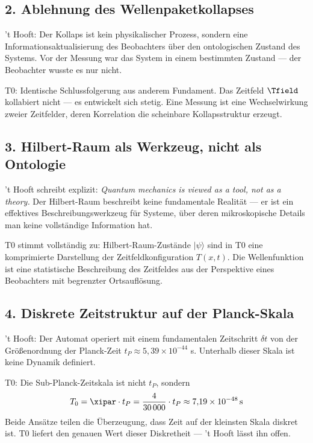 \subsection{2. Ablehnung des Wellenpaketkollapses}

't Hooft: Der Kollaps ist kein physikalischer Prozess, sondern eine
Informationsaktualisierung des Beobachters über den ontologischen Zustand des
Systems. Vor der Messung war das System in einem bestimmten Zustand — der
Beobachter wusste es nur nicht.

T0: Identische Schlussfolgerung aus anderem Fundament. Das Zeitfeld $\Tfield$
kollabiert nicht — es entwickelt sich stetig. Eine Messung ist eine
Wechselwirkung zweier Zeitfelder, deren Korrelation die scheinbare
Kollapsstruktur erzeugt.

\subsection{3. Hilbert-Raum als Werkzeug, nicht als Ontologie}

't Hooft schreibt explizit: \emph{Quantum mechanics is viewed as a tool, not as
a theory.} Der Hilbert-Raum beschreibt keine fundamentale Realität — er ist ein
effektives Beschreibungswerkzeug für Systeme, über deren mikroskopische Details
man keine vollständige Information hat.

T0 stimmt vollständig zu: Hilbert-Raum-Zustände $|\psi\rangle$ sind in T0 eine
komprimierte Darstellung der Zeitfeldkonfiguration $T(x,t)$. Die Wellenfunktion
ist eine statistische Beschreibung des Zeitfeldes aus der Perspektive eines
Beobachters mit begrenzter Ortsauflösung.

\subsection{4. Diskrete Zeitstruktur auf der Planck-Skala}

't Hooft: Der Automat operiert mit einem fundamentalen Zeitschritt $\delta t$
von der Größenordnung der Planck-Zeit $t_P \approx 5{,}39 \times 10^{-44}$ s.
Unterhalb dieser Skala ist keine Dynamik definiert.

T0: Die Sub-Planck-Zeitskala ist nicht $t_P$, sondern
\begin{equation}
    T_0 = \xipar \cdot t_P = \frac{4}{30\,000} \cdot t_P
    \approx 7{,}19 \times 10^{-48} \, \text{s}
    \label{eq:t0_time}
\end{equation}
Beide Ansätze teilen die Überzeugung, dass Zeit auf der kleinsten Skala diskret
ist. T0 liefert den genauen Wert dieser Diskretheit — 't Hooft lässt ihn offen.

